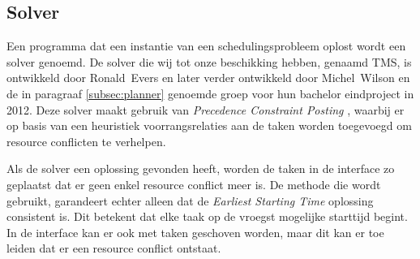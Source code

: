 \subsection{Solver}
\label{subsec:solver}

Een programma dat een instantie van een schedulingsprobleem oplost wordt een solver genoemd. De solver die wij tot onze beschikking hebben, genaamd TMS, is ontwikkeld door \mbox{Ronald Evers} \cite{ronaldevers2010} en later verder ontwikkeld door \mbox{Michel Wilson} en de in paragraaf \ref{subsec:planner} genoemde groep voor hun bachelor eindproject in 2012. Deze solver maakt gebruik van \emph{Precedence Constraint Posting} \cite{seminarium2014}, waarbij er op basis van een heuristiek voorrangsrelaties aan de taken worden toegevoegd om resource conflicten te verhelpen.

Als de solver een oplossing gevonden heeft, worden de taken in de interface zo geplaatst dat er geen enkel resource conflict meer is. De methode die wordt gebruikt, garandeert echter alleen dat de \emph{Earliest Starting Time} oplossing consistent is. Dit betekent dat elke taak op de vroegst mogelijke starttijd begint. In de interface kan er ook met taken geschoven worden, maar dit kan er toe leiden dat er een resource conflict ontstaat. 
